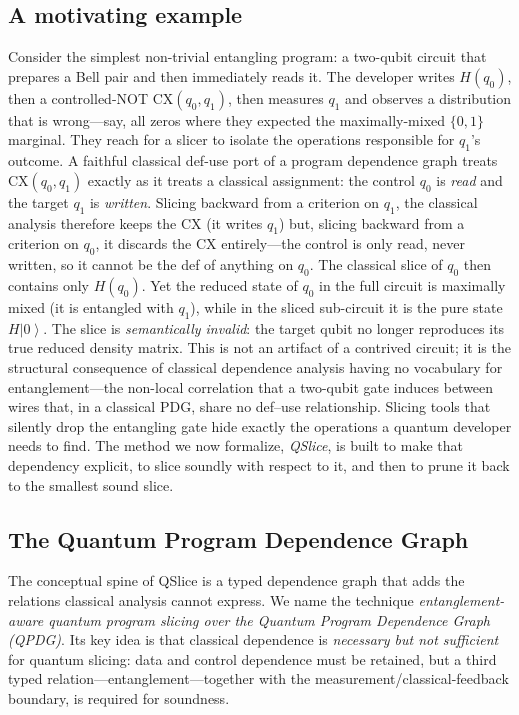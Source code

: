\documentclass[10pt,conference]{IEEEtran}
\providecommand{\ket}[1]{\ensuremath{\left|#1\right\rangle}}
\theoremstyle{definition}
\begin{document}
\subsection{A motivating example}
Consider the simplest non-trivial entangling program: a two-qubit circuit that prepares a Bell pair and then immediately reads it. The developer writes $H(q_0)$, then a controlled-NOT $\mathrm{CX}(q_0,q_1)$, then measures $q_1$ and observes a distribution that is wrong---say, all zeros where they expected the maximally-mixed $\{0,1\}$ marginal. They reach for a slicer to isolate the operations responsible for $q_1$'s outcome. A faithful classical def-use port of a program dependence graph treats $\mathrm{CX}(q_0,q_1)$ exactly as it treats a classical assignment: the control $q_0$ is \emph{read} and the target $q_1$ is \emph{written}. Slicing backward from a criterion on $q_1$, the classical analysis therefore keeps the $\mathrm{CX}$ (it writes $q_1$) but, slicing backward from a criterion on $q_0$, it discards the $\mathrm{CX}$ entirely---the control is only read, never written, so it cannot be the def of anything on $q_0$. The classical slice of $q_0$ then contains only $H(q_0)$. Yet the reduced state of $q_0$ in the full circuit is maximally mixed (it is entangled with $q_1$), while in the sliced sub-circuit it is the pure state $H\ket{0}$. The slice is \emph{semantically invalid}: the target qubit no longer reproduces its true reduced density matrix. This is not an artifact of a contrived circuit; it is the structural consequence of classical dependence analysis having no vocabulary for entanglement---the non-local correlation that a two-qubit gate induces between wires that, in a classical PDG, share no def--use relationship. Slicing tools that silently drop the entangling gate hide exactly the operations a quantum developer needs to find. The method we now formalize, \emph{QSlice}, is built to make that dependency explicit, to slice soundly with respect to it, and then to prune it back to the smallest sound slice.

\subsection{The Quantum Program Dependence Graph}
The conceptual spine of QSlice is a typed dependence graph that adds the relations classical analysis cannot express. We name the technique \emph{entanglement-aware quantum program slicing over the Quantum Program Dependence Graph (QPDG)}. Its key idea is that classical dependence is \emph{necessary but not sufficient} for quantum slicing: data and control dependence must be retained, but a third typed relation---entanglement---together with the measurement/classical-feedback boundary, is required for soundness.
\end{document}
